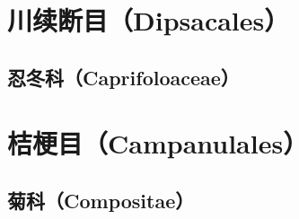 \documentclass[11pt]{article}
\begin{document}
\begin{sloppypar}
\section{川续断目（Dipsacales）}

\subsection{忍冬科（Caprifoloaceae）}
\section{桔梗目（Campanulales）}
\subsection{菊科（Compositae）}
\end{sloppypar}
\end{document}
